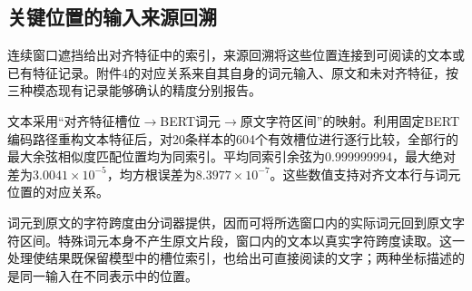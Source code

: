 \subsection{关键位置的输入来源回溯}\label{subsec:q3_grounding}
\QThreeParagraph 连续窗口遮挡给出对齐特征中的索引，来源回溯将这些位置连接到可阅读的文本或已有特征记录。附件4的对应关系来自其自身的词元输入、原文和未对齐特征，按三种模态现有记录能够确认的精度分别报告。

\QThreeParagraph 文本采用“对齐特征槽位$\rightarrow$BERT词元$\rightarrow$原文字符区间”的映射。利用固定BERT编码路径重构文本特征后，对20条样本的604个有效槽位进行逐行比较，全部行的最大余弦相似度匹配位置均为同索引。平均同索引余弦为0.999999994，最大绝对差为$3.0041\times10^{-5}$，均方根误差为$8.3977\times10^{-7}$。这些数值支持对齐文本行与词元位置的对应关系。

\QThreeParagraph 词元到原文的字符跨度由分词器提供，因而可将所选窗口内的实际词元回到原文字符区间。特殊词元本身不产生原文片段，窗口内的文本以真实字符跨度读取。这一处理使结果既保留模型中的槽位索引，也给出可直接阅读的文字；两种坐标描述的是同一输入在不同表示中的位置。

